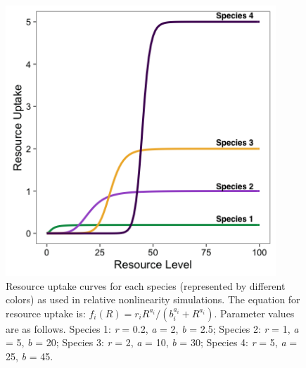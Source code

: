 \documentclass[11pt,]{article}
\begin{document}
\begin{figure}[!ht]
  \centering
      \includegraphics[width=4in]{./components/fourspp_Ruptake_relnonlin.png}
  \caption{Resource uptake curves for each species (represented by different colors) as used in relative nonlinearity simulations. The equation for resource uptake is: $f_{i}(R) = r_{i}R^{a_{i}} / (b_{i}^{a_{i}}+R^{a_{i}})$. Parameter values are as follows. Species 1: \emph{r} = 0.2, \emph{a} = 2, \emph{b} = 2.5; Species 2: \emph{r} = 1, \emph{a} = 5, \emph{b} = 20; Species 3: \emph{r} = 2, \emph{a} = 10, \emph{b} = 30; Species 4: \emph{r} = 5, \emph{a} = 25, \emph{b} = 45.}
\end{figure}

\newpage{}
\end{document}
